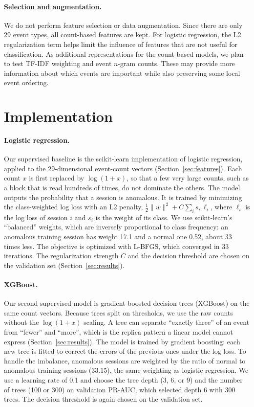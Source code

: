 \documentclass[11pt]{article}
\begin{document}
\paragraph{Selection and augmentation.} We do not perform feature selection or data augmentation. Since there are only 29 event types, all count-based features are kept. For logistic regression, the L2 regularization term helps limit the influence of features that are not useful for classification. As additional representations for the count-based models, we plan to test TF-IDF weighting and event $n$-gram counts. These may provide more information about which events are important while also preserving some local event ordering.

\section{Implementation}

\paragraph{Logistic regression.} Our supervised baseline is the scikit-learn implementation
of logistic regression, applied to the 29-dimensional event-count vectors
(Section~\ref{sec:features}). Each count $x$ is first replaced by $\log(1+x)$, so that a
few very large counts, such as a block that is read hundreds of times, do not dominate the
others. The model outputs the probability that a session is anomalous. It is trained by
minimizing the class-weighted log loss with an L2 penalty,
$\frac{1}{2}\|w\|^2 + C\sum_i s_i\,\ell_i$, where $\ell_i$ is the log loss of
session $i$ and $s_i$ is the weight of its class. We use scikit-learn's ``balanced''
weights, which are inversely proportional to class frequency: an anomalous training
session has weight 17.1 and a normal one 0.52, about 33 times less. The objective is
optimized with L-BFGS, which converged in 33 iterations. The regularization strength $C$
and the decision threshold are chosen on the validation set
(Section~\ref{sec:results}).

\paragraph{XGBoost.} Our second supervised model is gradient-boosted decision trees
(XGBoost) \citep{Chen2016xgboost} on the same count vectors. Because trees split on
thresholds, we use the raw counts without the $\log(1+x)$ scaling. A tree can separate
``exactly three'' of an event from ``fewer'' and ``more'', which is the replica pattern a
linear model cannot express (Section~\ref{sec:results}). The model is trained by gradient
boosting: each new tree is fitted to correct the errors of the previous ones under the
log loss. To handle the imbalance, anomalous sessions are weighted by the ratio of normal
to anomalous training sessions (33.15), the same weighting as logistic regression. We use a
learning rate of 0.1 and choose the tree depth (3, 6, or 9) and the number of trees (100 or
300) on validation PR-AUC, which selected depth 6 with 300 trees. The decision threshold is
again chosen on the validation set.
\end{document}
